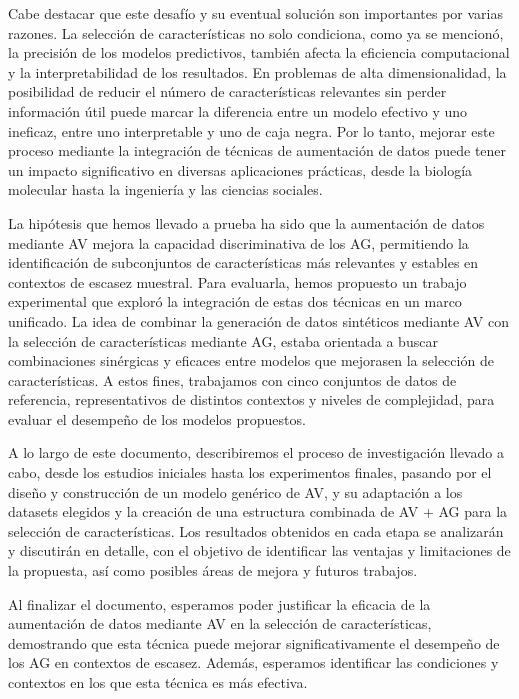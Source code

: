 Cabe destacar que este desafío y su eventual solución son importantes por varias razones. La selección de características no solo condiciona, como ya se mencionó, la precisión de los modelos predictivos, también afecta la eficiencia computacional y la interpretabilidad de los resultados. En problemas de alta dimensionalidad, la posibilidad de reducir el número de características relevantes sin perder información útil puede marcar la diferencia entre un modelo efectivo y uno ineficaz, entre uno interpretable y uno de caja negra. Por lo tanto, mejorar este proceso mediante la integración de técnicas de aumentación de datos puede tener un impacto significativo en diversas aplicaciones prácticas, desde la biología molecular hasta la ingeniería y las ciencias sociales.

La hipótesis que hemos llevado a prueba ha sido que la aumentación de datos mediante AV mejora la capacidad discriminativa de los AG, permitiendo la identificación de subconjuntos de características más relevantes y estables en contextos de escasez muestral. Para evaluarla, hemos propuesto un trabajo experimental que exploró la integración de estas dos técnicas en un marco unificado. La idea de combinar la generación de datos sintéticos mediante AV con la selección de características mediante AG, estaba orientada a buscar combinaciones sinérgicas y eficaces entre modelos que mejorasen la selección de características. A estos fines, trabajamos con cinco conjuntos de datos de referencia, representativos de distintos contextos y niveles de complejidad, para evaluar el desempeño de los modelos propuestos.

A lo largo de este documento, describiremos el proceso de investigación llevado a cabo, desde los estudios iniciales hasta los experimentos finales, pasando por el diseño y construcción de un modelo genérico de AV, y su adaptación a los datasets elegidos y la creación de una estructura combinada de AV + AG para la selección de características. Los resultados obtenidos en cada etapa se analizarán y discutirán en detalle, con el objetivo de identificar las ventajas y limitaciones de la propuesta, así como posibles áreas de mejora y futuros trabajos.

Al finalizar el documento, esperamos poder justificar la eficacia de la aumentación de datos mediante AV en la selección de características, demostrando que esta técnica puede mejorar significativamente el desempeño de los AG en contextos de escasez. Además, esperamos identificar las condiciones y contextos en los que esta técnica es más efectiva.

